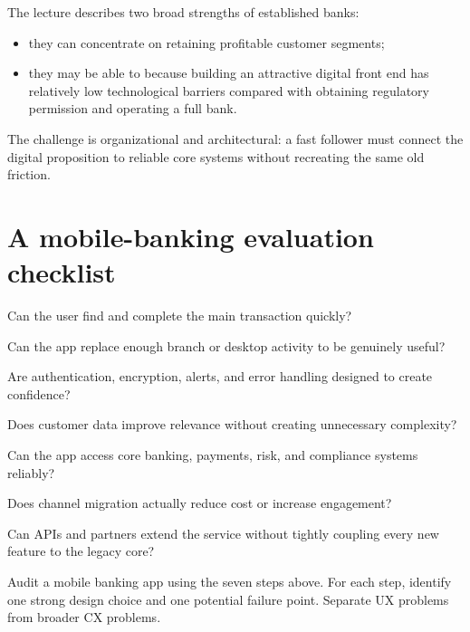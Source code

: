 The lecture describes two broad strengths of established banks:

\begin{itemize}
  \item they can concentrate on retaining profitable customer segments;
  \item they may be able to  because building an attractive digital front end has relatively low technological barriers compared with obtaining regulatory permission and operating a full bank.
\end{itemize}

The challenge is organizational and architectural: a fast follower must connect the digital proposition to reliable core systems without recreating the same old friction.

\section{A mobile-banking evaluation checklist}

\begin{mlsteps}
  \item {} Can the user find and complete the main transaction quickly?
  \item {} Can the app replace enough branch or desktop activity to be genuinely useful?
  \item {} Are authentication, encryption, alerts, and error handling designed to create confidence?
  \item {} Does customer data improve relevance without creating unnecessary complexity?
  \item {} Can the app access core banking, payments, risk, and compliance systems reliably?
  \item {} Does channel migration actually reduce cost or increase engagement?
  \item {} Can APIs and partners extend the service without tightly coupling every new feature to the legacy core?
\end{mlsteps}

\begin{tryit}
Audit a mobile banking app using the seven steps above. For each step, identify one strong design choice and one potential failure point. Separate UX problems from broader CX problems.
\end{tryit}

